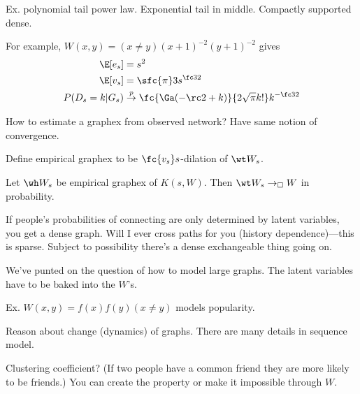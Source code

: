 Ex. polynomial tail power law. Exponential tail in middle. Compactly supported dense.

For example, $W(x,y) = (x\ne y) (x+1)^{-2}(y+1)^{-2}$ gives 
\begin{align}
\E[e_s] &= s^2\\
\E[v_s]&= \sfc{\pi}3 s^{\fc 32}\\
P(D_s=k|G_s)&\stackrel p{\to}\fc{\Ga(-\rc 2+k)}{2\sqrt \pi k!} k^{-\fc 32}
\end{align}

How to estimate a graphex from observed network? Have same notion of convergence.

Define empirical graphex to be $\fc{v_s}s$-dilation of $\wt W_s$. 

\begin{thm}
Let $\wh W_s$ be empirical graphex of $K(s,W)$. Then $\wt W_s\to_\square W$ in probability.
\end{thm}

If people's probabilities of connecting are only determined by latent variables, you get a dense graph.
Will I ever cross paths for you (history dependence)---this is sparse. Subject to possibility there's a dense exchangeable thing going on. 

We've punted on the question of how to model large graphs. The latent variables have to be baked into the $W$'s.

Ex. $W(x,y) = f(x)f(y)(x\ne y)$ models popularity. 


Reason about change (dynamics) of graphs. There are many details in sequence model.

Clustering coefficient? (If two people have a common friend they are more likely to be friends.) You can create the property or make it impossible through $W$.



\printbibliography
